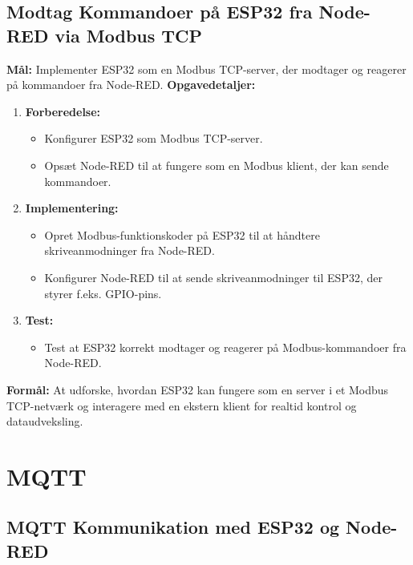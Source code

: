 \subsection*{Modtag Kommandoer på ESP32 fra Node-RED via Modbus TCP}
\textbf{Mål:} Implementer ESP32 som en Modbus TCP-server, der modtager og reagerer på kommandoer fra Node-RED.
\newline\newline\noindent
\textbf{Opgavedetaljer:}
\begin{enumerate}
	\item \textbf{Forberedelse:}
	\begin{itemize}
		\item Konfigurer ESP32 som Modbus TCP-server.
		\item Opsæt Node-RED til at fungere som en Modbus klient, der kan sende kommandoer.
	\end{itemize}
	\item \textbf{Implementering:}
	\begin{itemize}
		\item Opret Modbus-funktionskoder på ESP32 til at håndtere skriveanmodninger fra Node-RED.
		\item Konfigurer Node-RED til at sende skriveanmodninger til ESP32, der styrer f.eks. GPIO-pins.
	\end{itemize}
	\item \textbf{Test:}
	\begin{itemize}
		\item Test at ESP32 korrekt modtager og reagerer på Modbus-kommandoer fra Node-RED.
	\end{itemize}
\end{enumerate}
\textbf{Formål:} At udforske, hvordan ESP32 kan fungere som en server i et Modbus TCP-netværk og interagere med en ekstern klient for realtid kontrol og dataudveksling.

\section{MQTT}
\subsection*{MQTT Kommunikation med ESP32 og Node-RED}
